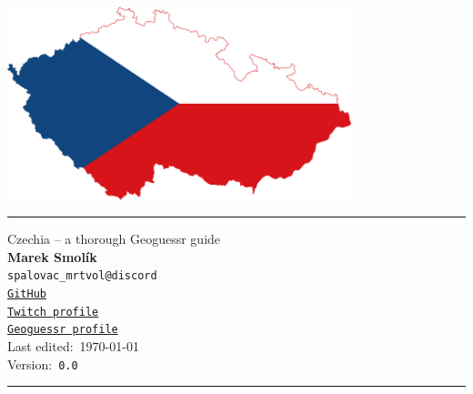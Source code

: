 \documentclass[12pt, oneside]{article}
\begin{document}
\thispagestyle{empty}
\begin{center}
	\includegraphics[width=10cm]{map.png}
	
  \vspace*{4em}

  \rule{\linewidth}{0.5mm}
  \vspace*{1em}
  
  {\LARGE Czechia – a thorough Geoguessr guide} \\ [1cm]
	\textbf{\Large Marek Smolík}
  \\ \texttt{spalovac\_mrtvol@discord}
  \\ \texttt{\href{https://github.com/dynamo58}{GitHub}}
  \\ \texttt{\href{https://www.twitch.tv/bigladmush22}{Twitch profile}}
  \\ \texttt{\href{https://www.geoguessr.com/user/5ee78ead03f80c500c7cba22}{Geoguessr profile}}
  \vspace*{1em}
  \\ Last edited:\ \today
  \\ Version:\ \texttt{0.0}


  \vspace*{1em}
  \rule{\linewidth}{0.5mm}
\end{center}

\newpage

\tableofcontents

\newpage

\begin{abstract}
Czechia or the Czech republic is a country notoriously difficult. For one thing it is very difficult to region-guess and at times also to distinguish from some of the surrounding countries. This document tries to outline all of the possible metas and actual geography knowledge there is to be obtain in order to guess this country accuretly and be able to make informed region-guesses within the country itself.
\end{abstract}
\end{document}
